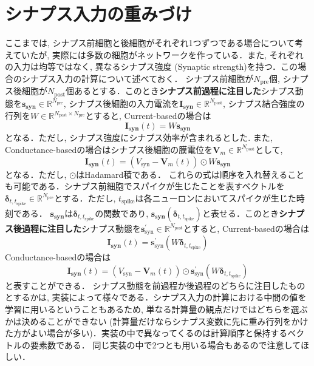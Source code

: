 \section{シナプス入力の重みづけ}
ここまでは, シナプス前細胞と後細胞がそれぞれ1つずつである場合について考えていたが, 実際には多数の細胞がネットワークを作っている．また, それぞれの入力は均等ではなく, 異なるシナプス強度 (Synaptic strength)を持つ．この場合のシナプス入力の計算について述べておく．
シナプス前細胞が$N_{\text{pre}}$個, シナプス後細胞が$N_{\text{post}}$個あるとする．このとき\textbf{シナプス前過程に注目した}シナプス動態を$\boldsymbol{s_{\text{syn}}}\in \mathbb{R}^{N_{\text{pre}}}$, シナプス後細胞の入力電流を$\boldsymbol{I_{\text{syn}}}\in \mathbb{R}^{N_{\text{post}}}$, シナプス結合強度の行列を$W\in \mathbb{R}^{N_{\text{post}} \times N_{\text{pre}}}$とすると, Current-basedの場合は
\begin{equation}
\boldsymbol{I_{\text{syn}}}(t)=W \boldsymbol{s_{\text{syn}}}  
\end{equation}
となる．ただし, シナプス強度にシナプス効率が含まれるとした. また, Conductance-basedの場合はシナプス後細胞の膜電位を$\boldsymbol{V}_{m}\in \mathbb{R}^{N_{\text{post}}}$として, 
\begin{equation}
\boldsymbol{I_{\text{syn}}}(t)=\left(V_{\text{syn}}-\boldsymbol{V}_{m}(t)\right)\odot W \boldsymbol{s_{\text{syn}}}
\end{equation}
となる．ただし, $\odot$はHadamard積である．
これらの式は順序を入れ替えることも可能である．シナプス前細胞でスパイクが生じたことを表すベクトルを$\boldsymbol{\delta}_{t,t_{\text{spike}}}\in \mathbb{R}^{N_{\text{pre}}}$とする．ただし, $t_{\text{spike}}$は各ニューロンにおいてスパイクが生じた時刻である． $\boldsymbol{s_{\text{syn}}}$は$\boldsymbol{\delta}_{t,t_{\text{spike}}}$の関数であり, $\boldsymbol{s_{\text{syn}}}(\boldsymbol{\delta}_{t,t_{\text{spike}}})$と表せる．このとき\textbf{シナプス後過程に注目した}シナプス動態を$\boldsymbol{s}^\prime_{\text{syn}}\in \mathbb{R}^{N_{\text{post}}}$とすると, Current-basedの場合は
\begin{equation}
\boldsymbol{I_{\text{syn}}}(t)=\boldsymbol{s}^\prime_{\text{syn}}(W\boldsymbol{\delta}_{t,t_{\text{spike}}})  
\end{equation}
Conductance-basedの場合は
\begin{equation}
\boldsymbol{I_{\text{syn}}}(t)=\left(V_{\text{syn}}-\boldsymbol{V}_{m}(t)\right)\odot \boldsymbol{s}^\prime_{\text{syn}}(W\boldsymbol{\delta}_{t,t_{\text{spike}}})
\end{equation}
と表すことができる．
シナプス動態を前過程か後過程のどちらに注目したものとするかは, 実装によって様々である．シナプス入力の計算における中間の値を学習に用いるということもあるため, 単なる計算量の観点だけではどちらを選ぶかは決めることができない (計算量だけならシナプス変数に先に重み行列をかけた方がよい場合が多い)．実装の中で異なってくるのは計算順序と保持するベクトルの要素数である． 同じ実装の中で2つとも用いる場合もあるので注意してほしい．
